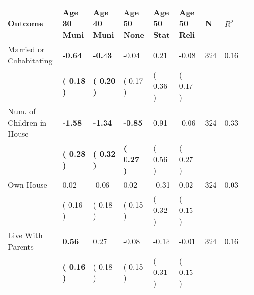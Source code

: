 \begin{tabular}{L{6.2cm} C{1.8cm} C{1.8cm} C{1.8cm} C{1.8cm} C{1.8cm} C{1.8cm} C{0.3cm} C{0.3cm}}
\toprule
 \textbf{Outcome} & \textbf{Age 30 Muni} & \textbf{Age 40 Muni} & \textbf{Age 50 None} & \textbf{Age 50 Stat} & \textbf{Age 50 Reli} & \textbf{N} & \textbf{$ R^2$} \\
\midrule
Married or Cohabitating & \textbf{    -0.64} & \textbf{    -0.43} &     -0.04 &      0.21 &     -0.08  & 324 &       0.16 \\ 
 & \textbf{(     0.18 )} & \textbf{(     0.20 )} & (     0.17 ) & (     0.36 ) & (     0.17 )  & \\
Num. of Children in House & \textbf{    -1.58} & \textbf{    -1.34} & \textbf{    -0.85} &      0.91 &     -0.06  & 324 &       0.33 \\ 
 & \textbf{(     0.28 )} & \textbf{(     0.32 )} & \textbf{(     0.27 )} & (     0.56 ) & (     0.27 )  & \\
Own House &      0.02 &     -0.06 &      0.02 &     -0.31 &      0.02  & 324 &       0.03 \\ 
 & (     0.16 ) & (     0.18 ) & (     0.15 ) & (     0.32 ) & (     0.15 )  & \\
Live With Parents & \textbf{     0.56} &      0.27 &     -0.08 &     -0.13 &     -0.01  & 324 &       0.16 \\ 
 & \textbf{(     0.16 )} & (     0.18 ) & (     0.15 ) & (     0.31 ) & (     0.15 )  & \\
\bottomrule
\end{tabular}

